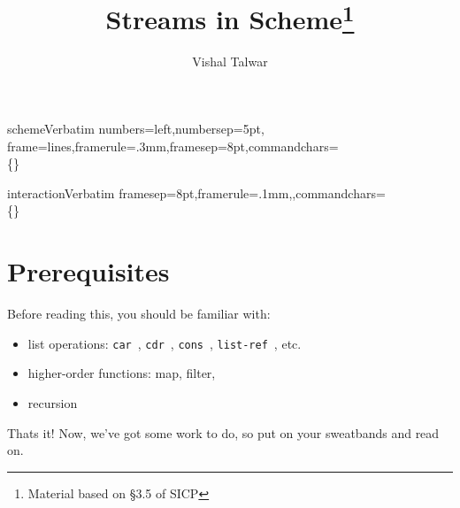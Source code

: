 \documentclass[pdftex,11pt]{article}
\author{Vishal Talwar}
\title{Streams in Scheme\footnote{Material based on \S3.5 of SICP}}
\begin{document}
\maketitle

\DefineVerbatimEnvironment%
  {scheme}{Verbatim}
  {numbers=left,numbersep=5pt,
   frame=lines,framerule=.3mm,framesep=8pt,commandchars=\\\{\}}

\DefineVerbatimEnvironment%
  {interaction}{Verbatim}
  {framesep=8pt,framerule=.1mm,,commandchars=\\\{\}}

\newcommand{\fiblist}{{\tt fibs}\ }
\newcommand{\fiblistf}[1]{{\tt (fibs-from #1)}}
\newcommand{\scons}{{\tt s-cons}\ }
\newcommand{\scar}{{\tt s-car}\ }
\newcommand{\scdr}{{\tt s-cdr}\ }
\newcommand{\sref}{{\tt s-ref}\ }
\newcommand{\sgen}{{\tt s-generate}\ }
\newcommand{\smap}{{\tt s-map}\ }
\newcommand{\smerge}{{\tt s-merge}\ }
\newcommand{\sfilt}{{\tt s-filter}\ }
\newcommand{\sinter}{{\tt s-interleave}\ }
\newcommand{\cons}{{\tt cons}\ }
\newcommand{\car}{{\tt car}\ }
\newcommand{\cdr}{{\tt cdr}\ }
\newcommand{\lref}{{\tt list-ref}\ }
\section{Prerequisites}
Before reading this, you should be familiar with:
\begin{itemize}
\item list operations: \car, \cdr, \cons, \lref, etc.
\item higher-order functions: map, filter, 
\item recursion
\end{itemize}
Thats it! Now, we've got some work to do, so put on your sweatbands
and read on.
\end{document}
